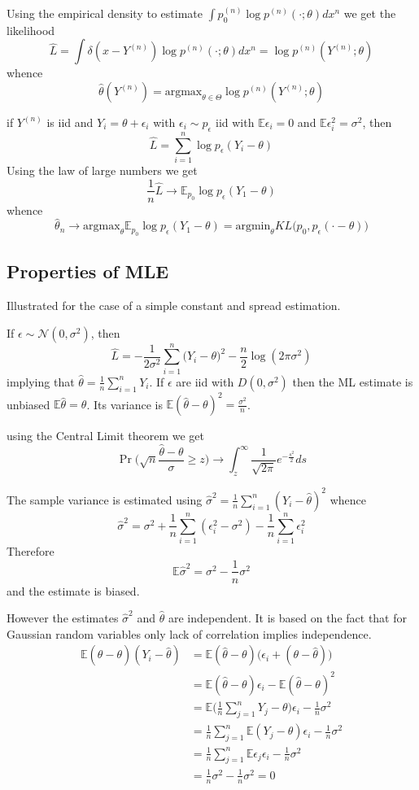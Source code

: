 \documentclass[a4paper]{article}
\newcommand{\Ncal}{\mathcal{N}}
\newcommand{\Ex}{\mathbb{E}}
\begin{document}
Using the empirical density to estimate $\int p^{(n)}_0 \log p^{(n)}(\cdot;\theta) dx^n$ we get the likelihood
\[\hat{L} = \int \delta(x-Y^{(n)}) \log p^{(n)}(\cdot;\theta) dx^n = \log p^{(n)}(Y^{(n)};\theta)\]
whence 
\[\hat{\theta}(Y^{(n)}) = \text{argmax}_{\theta\in \Theta} \log p^{(n)}(Y^{(n)};\theta)\]

if $Y^{(n)}$ is iid and $Y_i = \theta + \epsilon_i$ with $\epsilon_i\sim p_\epsilon$ iid with $\Ex \epsilon_i = 0$ and $\Ex \epsilon_i^2 = \sigma^2$, then
\[\hat{L} = \sum_{i=1}^n\log p_\epsilon(Y_i-\theta)\]
Using the law of large numbers we get
\[\frac{1}{n}\hat{L} \to \Ex_{p_0}\log p_\epsilon(Y_1-\theta)\]
whence
\[\hat{\theta}_n \to \text{argmax}_{\theta}\Ex_{p_0}\log p_\epsilon(Y_1-\theta) = \text{argmin}_{\theta} KL\Big(p_0,p_\epsilon(\cdot - \theta)\Big)\]


\subsection{Properties of MLE} %
\label{sub:properties_of_mle}
Illustrated for the case of a simple constant and spread estimation.

If $\epsilon\sim \Ncal(0,\sigma^2)$, then 
\[\hat{L} = -\frac{1}{2\sigma^2}\sum_{i=1}^n\big(Y_i-\theta\big)^2 - \frac{n}{2}\log(2\pi \sigma^2)\]
implying that $\hat{\theta} = \frac{1}{n}\sum_{i=1}^n Y_i$.
If $\epsilon$ are iid with $D(0,\sigma^2)$ then the ML estimate is unbiased $\Ex \hat{\theta} = \theta$.
Its variance is $\Ex (\hat{\theta}-\theta)^2 = \frac{\sigma^2}{n}$.

using the Central Limit theorem we get
\[\Pr\big(\sqrt{n} \frac{\hat{\theta}-\theta}{\sigma} \geq z\big)\to \int_z^\infty \frac{1}{\sqrt{2\pi}} e^{-\frac{s^2}{2}}ds \]

The sample variance is estimated using $\hat{\sigma}^2 = \frac{1}{n}\sum_{i=1}^n(Y_i - \hat{\theta})^2$ whence
\[\hat{\sigma}^2 = \sigma^2 + \frac{1}{n}\sum_{i=1}^n (\epsilon_i^2 - \sigma^2) - \frac{1}{n} \sum_{i=1}^n \epsilon_i^2\]
Therefore
\[\Ex \hat{\sigma}^2 = \sigma^2 - \frac{1}{n}\sigma^2 \]
and the estimate is biased.

However the estimates $\hat{\sigma}^2$ and $\hat{\theta}$ are independent. It is based on the fact that for Gaussian random variables only lack of correlation implies independence.
\begin{align*}
	\Ex (\hat{\theta}-\theta) (Y_i - \hat{\theta})
	&= \Ex (\hat{\theta}-\theta) \big(\epsilon_i + (\theta - \hat{\theta}) \big) \\
	&= \Ex (\hat{\theta}-\theta)\epsilon_i - \Ex (\hat{\theta}-\theta)^2 \\
	&= \Ex \Big(\frac{1}{n}\sum_{j=1}^n Y_j-\theta\Big)\epsilon_i - \frac{1}{n}\sigma^2 \\
	&= \frac{1}{n}\sum_{j=1}^n \Ex (Y_j - \theta)\epsilon_i - \frac{1}{n}\sigma^2 \\
	&= \frac{1}{n}\sum_{j=1}^n \Ex \epsilon_j\epsilon_i - \frac{1}{n}\sigma^2 \\
	&= \frac{1}{n}\sigma^2 - \frac{1}{n}\sigma^2 = 0
\end{align*}
\end{document}
